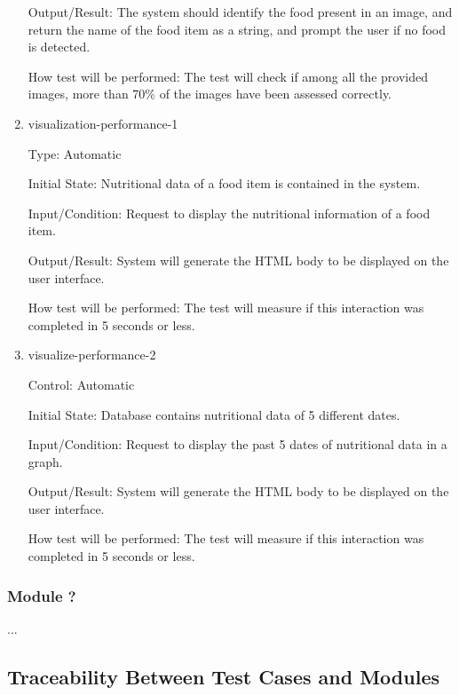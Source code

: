 \documentclass[12pt, titlepage]{article}
\begin{document}
\begin{enumerate}
		Output/Result: The system should identify the food present in an image, 
		and return the name of the food item as a string, and prompt the user 
		if no food is detected.
		
		How test will be performed: The test will check if among all the 
		provided images, more than 70\% of the images have been assessed 
		correctly.
		
		\item{visualization-performance-1\\}
		
		Type: Automatic
		
		Initial State: Nutritional data of a food item is contained in the 
		system.
		
		Input/Condition: Request to display the nutritional information of a 
		food item.
		
		Output/Result: System will generate the HTML body to be displayed on 
		the user 
		interface.
		
		How test will be performed: The test will measure if this interaction 
		was completed in 5 seconds or less.
		
		\item{visualize-performance-2\\}
		
		Control: Automatic
		
		Initial State: Database contains nutritional data of 5 different dates.
		
		Input/Condition: Request to display the past 5 dates of nutritional 
		data in a graph.
		
		Output/Result: System will generate the HTML body to be displayed on 
		the user interface.
		
		How test will be performed: The test will measure if this interaction 
		was completed in 5 seconds or less.
		
	\end{enumerate}
	
	\subsubsection{Module ?}
	
	...
	
	\subsection{Traceability Between Test Cases and Modules}
	
	
\end{document}
